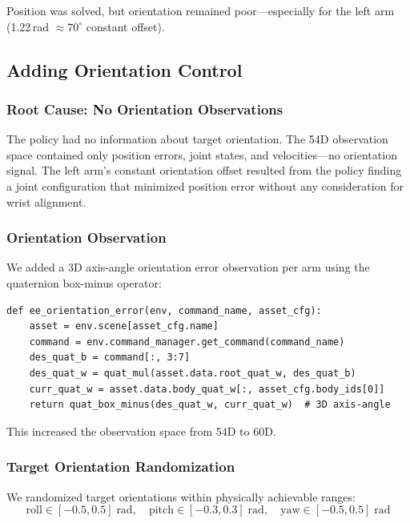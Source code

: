 \documentclass[11pt,a4paper]{article}
\begin{document}
\noindent Position was solved, but orientation remained poor---especially for the left arm (1.22\,rad $\approx 70^\circ$ constant offset).

\subsection{Adding Orientation Control}
\label{sec:orientation}

\subsubsection{Root Cause: No Orientation Observations}
The policy had no information about target orientation. The 54D observation space contained only position errors, joint states, and velocities---no orientation signal. The left arm's constant orientation offset resulted from the policy finding a joint configuration that minimized position error without any consideration for wrist alignment.

\subsubsection{Orientation Observation}
We added a 3D axis-angle orientation error observation per arm using the quaternion box-minus operator:

\begin{lstlisting}[caption={Orientation error observation},label={lst:orient_obs}]
def ee_orientation_error(env, command_name, asset_cfg):
    asset = env.scene[asset_cfg.name]
    command = env.command_manager.get_command(command_name)
    des_quat_b = command[:, 3:7]
    des_quat_w = quat_mul(asset.data.root_quat_w, des_quat_b)
    curr_quat_w = asset.data.body_quat_w[:, asset_cfg.body_ids[0]]
    return quat_box_minus(des_quat_w, curr_quat_w)  # 3D axis-angle
\end{lstlisting}

\noindent This increased the observation space from 54D to 60D.

\subsubsection{Target Orientation Randomization}
We randomized target orientations within physically achievable ranges:
\begin{equation}
  \text{roll} \in [-0.5, 0.5]\;\text{rad},\quad
  \text{pitch} \in [-0.3, 0.3]\;\text{rad},\quad
  \text{yaw} \in [-0.5, 0.5]\;\text{rad}
\end{equation}
\end{document}
